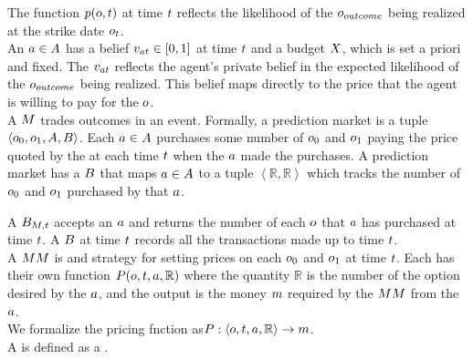 The function $p(o,t)$ at time $t$ reflects the likelihood 
of the $o_{outcome}$ being realized at the strike date $o_{t}$.\\

An  $a\in A$ has a belief $v_{at} \in [0,1]$ 
at time $t$ and a budget $X$, which is set a priori and fixed. The $v_{at}$ 
reflects the agent's private belief in the expected likelihood of the $o_{outcome}$ 
being realized. This belief maps directly to the price that the agent is willing to pay 
for the $o$.\\

A  $M$ trades outcomes in an event. Formally, a prediction market 
is a tuple $\left<o_0,o_1, A, B\right>$. Each  
$a\in A$ purchases some number of $o_0$ and $o_1$ paying the price 
quoted by the  at each time $t$ when the  $a$ 
made the purchases. A prediction market has a  $B$ that maps $a\in A$ to a tuple $\left<\mathbb{R},\mathbb{R}\right>$ which tracks the number of $o_0$ and $o_1$ 
purchased by that  $a$.

A  $B_{M,t}$ accepts an  $a$ and returns the number of 
each  $o$ that  $a$ has purchased at time $t$. A 
 $B$ at time $t$ records all the transactions made up to time $t$.\\

A  $MM$ is  and strategy for setting prices
on each  $o_0$ and $o_1$ at time $t$. Each  has
their own function $P(o,t,a,\mathbb{R})$ where the quantity $\mathbb{R}$ is the
number of the option desired by the  $a$, and the output is the money $m$
required by the  $MM$ from the  $a$. \\

We formalize the pricing fnction as$P:\left<o,t,a,\mathbb{R}\right> \rightarrow m$.\\

A  is defined as a .\\

